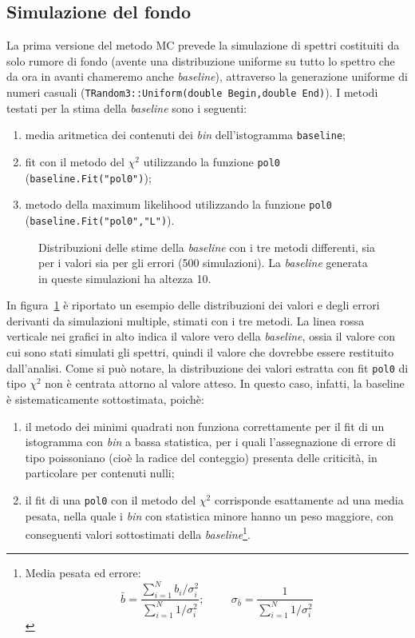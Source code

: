 \documentclass[10pt, oneside, a4paper]{article}   	%
\begin{document}
\subsection{Simulazione del fondo}
La prima versione del metodo MC prevede la simulazione di spettri costituiti da solo rumore di fondo (avente una distribuzione uniforme su tutto lo spettro che da ora in avanti chameremo anche \textit{baseline}), attraverso la generazione uniforme di numeri casuali (\lstinline{TRandom3::Uniform(double Begin,double End)}). 
I metodi testati per la stima della \textit{baseline} sono i seguenti:
\begin{enumerate}
 \item media aritmetica dei contenuti dei \emph{bin} dell'istogramma \lstinline{baseline};
 \item fit con il metodo del $\chi^2$ utilizzando la funzione \lstinline{pol0} (\lstinline{baseline.Fit("pol0")});
 \item metodo della maximum likelihood utilizzando la funzione \newline \lstinline{pol0} (\lstinline{baseline.Fit("pol0","L")}).
\end{enumerate}
%
\begin{figure}[H]
 \centerline{}
 \caption{Distribuzioni delle stime della \textit{baseline} con i tre metodi differenti, sia per i valori sia per gli errori (500 simulazioni). La \textit{baseline} generata in queste simulazioni ha altezza 10.}\label{fig::baseline_500}
\end{figure}
%
In figura~\ref{fig::baseline_500} è riportato un esempio delle distribuzioni dei valori e degli errori derivanti da simulazioni multiple, stimati con i tre metodi. La linea rossa verticale nei grafici in alto indica il valore vero della \textit{baseline}, ossia il valore con cui sono stati simulati gli spettri, quindi il valore che dovrebbe essere restituito dall'analisi. Come si può notare, la distribuzione dei valori estratta con fit \lstinline{pol0} di tipo $\chi^2$ non è centrata attorno al valore atteso. In questo caso, infatti, la baseline è sistematicamente sottostimata, poichè:
\begin{enumerate}
 \item il metodo dei minimi quadrati non funziona correttamente per il fit di un istogramma con \emph{bin} a bassa statistica, per i quali l'assegnazione di errore di tipo poissoniano (cioè la radice del conteggio) presenta delle criticità, in particolare per contenuti nulli;
 \item il fit di una \lstinline{pol0} con il metodo del $\chi^2$ corrisponde esattamente ad una media pesata, nella quale i \emph{bin} con statistica minore hanno un peso maggiore, con conseguenti valori sottostimati della \textit{baseline}\footnote{Media pesata ed errore:
$$\bar{b}=\frac{\sum_{i=1}^N b_i/\sigma_i^2}{\sum_{i=1}^N 1/\sigma_i^2};
\hspace{1cm} \sigma_{\bar{b}}=\frac{1}{\sum_{i=1}^N1/\sigma_i^2}$$}.
 
\end{enumerate}
\end{document}
